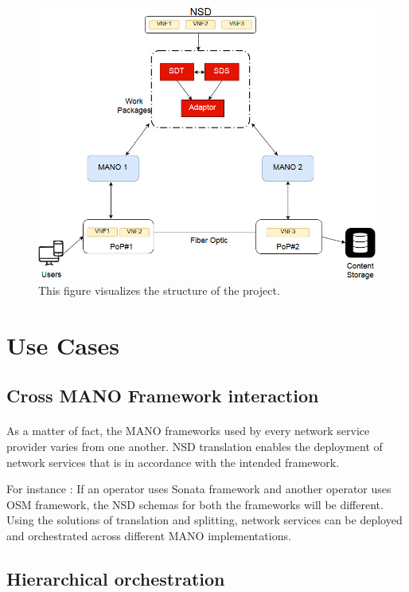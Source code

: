 \begin{figure}
	\centering
	\includegraphics[width=0.7\linewidth]{figures/Structure_Updated1}
	\caption{This figure visualizes the structure of the project. }
	\label{fig:structureupdated1}
\end{figure}


\newpage
\section{Use Cases}

\subsection{Cross MANO Framework interaction}
\paragraph{}

As a matter of fact, the MANO frameworks used by every network service provider varies from one another. NSD translation enables the deployment of network services that is in accordance with the intended framework.

For instance : If an operator uses Sonata framework and another operator uses OSM framework, the NSD schemas for both the frameworks will be different. Using the solutions of translation and splitting, network services can be deployed and orchestrated across different MANO implementations.

\subsection{Hierarchical orchestration}
